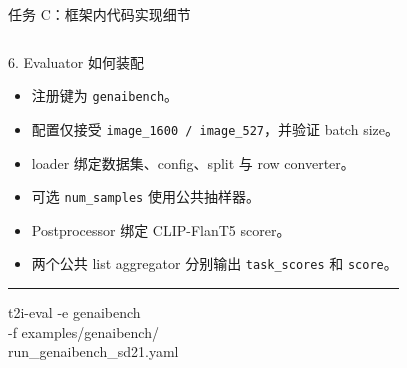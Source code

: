 \documentclass[aspectratio=169,10pt]{beamer}
\begin{document}
\begin{frame}{任务 C：框架内代码实现细节}
\begin{columns}[T,onlytextwidth]
      \begin{block}{6. Evaluator 如何装配}
        \begin{minipage}[c][5.05cm][c]{\linewidth}
          \begin{itemize}\scriptsize
            \item 注册键为 \texttt{genaibench}。
            \item 配置仅接受 \texttt{image\_1600 / image\_527}，并验证 batch size。
            \item loader 绑定数据集、config、split 与 row converter。
            \item 可选 \texttt{num\_samples} 使用公共抽样器。
            \item Postprocessor 绑定 CLIP-FlanT5 scorer。
            \item 两个公共 list aggregator 分别输出 \texttt{task\_scores} 和 \texttt{score}。
          \end{itemize}
          \vspace{0.45em}
          \color{T2IGray}\rule{\linewidth}{0.35pt}\par\vspace{0.3em}
          \scriptsize\ttfamily
          t2i-eval -e genaibench\\
          -f examples/genaibench/\\
          \quad run\_genaibench\_sd21.yaml
        \end{minipage}
      \end{block}
  \end{columns}
\end{frame}
\end{document}
